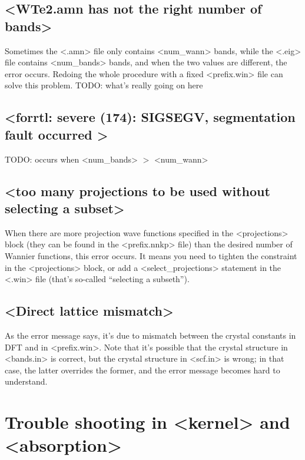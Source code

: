 \documentclass[hyperref, a4paper, 12pt]{report}
\def\texttt#1{<#1>}%
\newcommand{\shortcode}[1]{\texttt{#1}}
\begin{document}
\subsection{\shortcode{WTe2.amn has not the right number of bands}}

Sometimes the \shortcode{.amn} file only contains 
\shortcode{num_wann} bands,
while the \shortcode{.eig} file contains \shortcode{num_bands} bands,
and when the two values are different,
the error occurs. 
Redoing the whole procedure with a fixed \shortcode{prefix.win} file 
can solve this problem.
TODO: what's really going on here

\subsection{\shortcode{forrtl: severe (174): SIGSEGV, segmentation fault occurred }}

TODO: occurs when \shortcode{num_bands} $>$ \shortcode{num_wann}

\subsection{\shortcode{too many projections to be used without selecting a subset}}

When there are more 
projection wave functions specified in the \shortcode{projections} block 
(they can be found in the \shortcode{prefix.nnkp} file)
than the desired number of Wannier functions,
this error occurs.
It means you need to tighten the constraint in the \shortcode{projections} block, 
or add a \shortcode{select_projections} statement in the \shortcode{.win} file
(that's so-called ``selecting a subseth'').

\subsection{\shortcode{Direct lattice mismatch}}

As the error message says, 
it's due to mismatch between the crystal constants in DFT 
and in \shortcode{prefix.win}.
Note that it's possible that the crystal structure 
in \shortcode{bands.in} is correct, 
but the crystal structure in \shortcode{scf.in} is wrong; 
in that case, the latter overrides the former, 
and the error message becomes hard to understand. 

\section{Trouble shooting in \shortcode{kernel} and \shortcode{absorption}}
\end{document}
